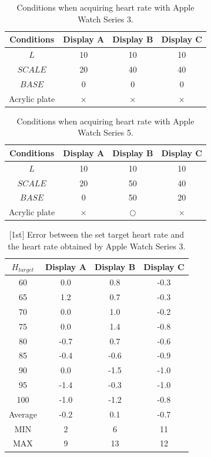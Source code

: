 \documentclass[sigchi,authordraft]{acmart}
\begin{document}
\begin{table}[!t]
  \centering
  \caption{Conditions when acquiring heart rate with Apple Watch Series 3.}
  \begin{tabular}{c|c|c|c} \hline\hline
    Conditions & Display A & Display B & Display C \\ \hline
    $L$ & 10 & 10 & 10 \\
    $SCALE$ & 20 & 40 & 40 \\
    $BASE$ & 0 & 0 & 0 \\
    Acrylic plate & $\times$ & $\times$ & $\times$ \\ \hline
  \end{tabular}
  \label{tab:series3_params}
\end{table}

\begin{table}[!t]
  \centering
  \caption{Conditions when acquiring heart rate with Apple Watch Series 5.}
  \begin{tabular}{c|c|c|c} \hline\hline
    Conditions & Display A & Display B & Display C \\ \hline
    $L$ & 10 & 10 & 10 \\
    $SCALE$ & 20 & 50 & 40 \\
    $BASE$ & 0 & 50 & 20 \\
    Acrylic plate & $\times$ & $\bigcirc$ & $\times$ \\ \hline
  \end{tabular}
  \label{tab:series5_params}
\end{table}

\begin{table}[!t]
  \centering
  \caption{[1st] Error between the set target heart rate and the heart rate obtained by Apple Watch Series 3.}
  \begin{tabular}{c|c|c|c} \hline\hline
    $H_{target}$ & Display A & Display B & Display C \\ \hline
    60 & 0.0 & 0.8 & -0.3 \\
    65 & 1.2 & 0.7 & -0.3 \\
    70 & 0.0 & 1.0 & -0.2 \\
    75 & 0.0 & 1.4 & -0.8 \\
    80 & -0.7 & 0.7 & -0.6 \\
    85 & -0.4 & -0.6 & -0.9 \\
    90 & 0.0 & -1.5 & -1.0 \\
    95 & -1.4 & -0.3 & -1.0 \\
    100 & -1.0 & -1.2 & -0.8 \\ \hline
    Average & -0.2 & 0.1 & -0.7 \\ \hline \hline
    MIN & 2 & 6 & 11 \\ \hline
    MAX & 9 & 13 & 12 \\ \hline
  \end{tabular}
  \label{tab:series3_result_1st}
\end{table}
\end{document}
